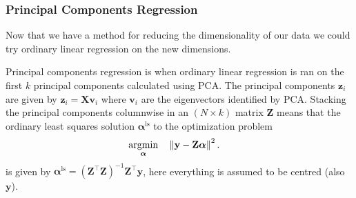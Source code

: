 \documentclass[a4paper, 12pt]{scrartcl}
\newcommand{\bfalpha}{\boldsymbol{\alpha}}
\begin{document}
\subsubsection*{Principal Components Regression}
Now that we have a method for reducing the dimensionality of our data we could try ordinary linear regression on the new dimensions.
\begin{algorithm}
	Principal components regression is when ordinary linear regression is ran on the first $k$ principal components calculated using PCA.
	The principal components $\mathbf{z}_i$ are given by $\mathbf{z}_i=\mathbf{X}\mathbf{v}_i$ where $\mathbf{v}_i$ are the eigenvectors identified by PCA.
	Stacking the principal components columnwise in an $\left(N\times k\right)$ matrix $\mathbf{Z}$ means that the ordinary least squares solution $\bfalpha^\mathrm{ls}$ to the optimization problem
	\begin{equation*}
	\begin{aligned}
	\operatornamewithlimits{argmin}_{\bfalpha} & & &\left\|\mathbf{y}-\mathbf{Z}\bfalpha\right\|^2.
	\end{aligned}
	\end{equation*}
	is given by $\bfalpha^\mathrm{ls}=\left(\mathbf{Z}^\intercal\mathbf{Z}\right)^{-1}\mathbf{Z}^\intercal\mathbf{y}$, here everything is assumed to be centred (also $\mathbf{y}$).
\end{algorithm}
\end{document}
